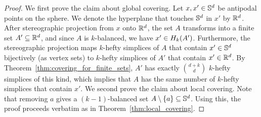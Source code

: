 \documentclass[10pt,a4paper]{article}
\newcommand {\mm}[1] {\ifmmode{#1}\else{\mbox{\(#1\)}}\fi}
\theoremstyle{plain}
\newcommand{\Rspace}        {\mm{{\mathbb R}}}
\newcommand{\Sspace}        {\mm{{\mathbb S}}}
\newcommand{\Hull}[2]       {\mm{{H}_{#1}{({#2})}}}
\begin{document}
\begin{proof}
  We first prove the claim about global covering.
  Let $x, x' \in \Sspace^d$ be antipodal points on the sphere.
  We denote the hyperplane that touches $\Sspace^d$ in $x'$ by $\Rspace^d$.
  After stereographic projection from $x$ onto $\Rspace^d$, the set $A$ transforms into a finite set $A' \subseteq \Rspace^d$, and since $A$ is $k$-balanced, we have $x' \in \Hull{k}{A'}$.
  Furthermore, the stereographic projection maps $k$-hefty simplices of $A$ that contain $x' \in \Sspace^d$ bijectively (as vertex sets) to $k$-hefty simplices of $A'$ that contain $x' \in \Rspace^d$.
  By Theorem~\ref{thm:covering_for_finite_sets}, $A'$ has exactly $\binom{d+k}{d}$ $k$-hefty simplices of this kind, which implies that $A$ has the same number of $k$-hefty simplices that contain $x'$.
  \smallskip
  We second prove the claim about local covering.
  Note that removing $a$ gives a $(k-1)$-balanced set $A\setminus\{a\} \subseteq \Sspace^d$. 
  Using this, the proof proceeds verbatim as in Theorem~\ref{thm:local_covering}.
\end{proof}
\end{document}
